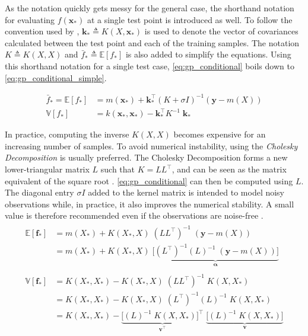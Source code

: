 As the notation quickly gets messy for the general case, the shorthand notation for evaluating $f(\boldsymbol{x}_*)$ at a single test point is introduced as well. To follow the convention used by \cite{rasmussen}, $\boldsymbol{k}_* \triangleq K(X, \boldsymbol{x}_*)$ is used to denote the vector of covariances calculated between the test point and each of the training samples. The notation $K \triangleq K(X, X)$ and $\bar{f}_* \triangleq \mathbb{E}[f_*]$ is also added to simplify the equations. Using this shorthand notation for a single test case, \cref{eq:gp_conditional} boils down to \cref{eq:gp_conditional_simple}.

\begin{subequations}\label{eq:gp_conditional_simple}
\begin{align}
    \bar{f}_* = \mathbb{E}[f_*]  &= m(\boldsymbol{x}_*) + \boldsymbol{k}_*^\intercal ( K + \sigma I)^{-1} (\boldsymbol{y} - m(X))\\
    \mathbb{V}[f_*] &= k(\boldsymbol{x}_*, \boldsymbol{x}_*) - \boldsymbol{k}_*^\intercal K^{-1} \; \boldsymbol{k}_*\label{eq:gp_conditional_var_simple}
\end{align}
\end{subequations}

In practice, computing the inverse $K(X, X)$ becomes expensive for an increasing number of samples. To avoid numerical instability, using the \textit{Cholesky Decomposition} is usually preferred. The Cholesky Decomposition forms a new lower-triangular matrix $L$ such that $K = L L^\intercal$, and can be seen as the matrix equivalent of the square root . \cref{eq:gp_conditional} can then be computed using $L$. The diagonal entry $\sigma I$ added to the kernel matrix is intended to model noisy observations while, in practice, it also improves the numerical stability. A small value is therefore recommended even if the observations are noise-free \cite{scikit-learn}.
\begin{subequations}
\begin{align}
    \begin{split}
    \mathbb{E}[{\boldsymbol{f}}_*] &= m(X_*) + K(X_*, X) \; (L L^\intercal)^{-1} \; (\boldsymbol{y} - m(X))\\ &= m(X_*) + K(X_*, X) \; \underbrace{\big[(L^\intercal)^{-1} (L)^{-1}  \; (\boldsymbol{y} - m(X))\big]}_{\boldsymbol{\alpha}}
    \end{split}\\
    \begin{split}
    \mathbb{V}[\boldsymbol{f}_*] &= K(X_*, X_*) - K(X_*, X) \; (L L^\intercal)^{-1} \; K(X, X_*)\\
    &= K(X_*, X_*) - K(X_*, X) \; (L^\intercal)^{-1} (L)^{-1} \; K(X, X_*)\\
    &= K(X_*, X_*) - \underbrace{\big[(L)^{-1} \; K(X, X_*)\big]^\intercal}_{\boldsymbol{v^\intercal}} \; \underbrace{\big[(L)^{-1} \; K(X, X_*)\big]}_{\boldsymbol{v}}
    \end{split}
\end{align}
\end{subequations}

